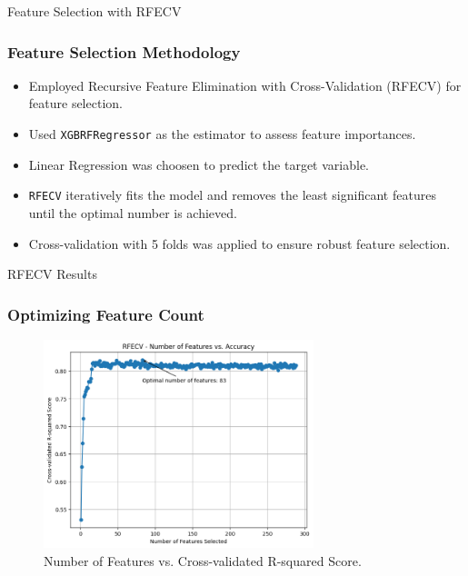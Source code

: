 \begin{frame}{Feature Selection with RFECV}
    \frametitle{Feature Selection Methodology}
    \begin{itemize}
        \item Employed Recursive Feature Elimination with Cross-Validation (RFECV) for feature selection.
        \item Used \texttt{XGBRFRegressor} as the estimator to assess feature importances.
        \item Linear Regression was choosen to predict the target variable.
        \item \texttt{RFECV} iteratively fits the model and removes the least significant features until the optimal number is achieved.
        \item Cross-validation with 5 folds was applied to ensure robust feature selection.
    \end{itemize}
\end{frame}

\begin{frame}{RFECV Results}
    \frametitle{Optimizing Feature Count}
    \begin{figure}
        \includegraphics[width=0.7\textwidth]{figures/n_features_vs_score.png} 
        \caption{Number of Features vs. Cross-validated R-squared Score.}
        \label{fig:rfecv_plot}
    \end{figure}
\end{frame}

